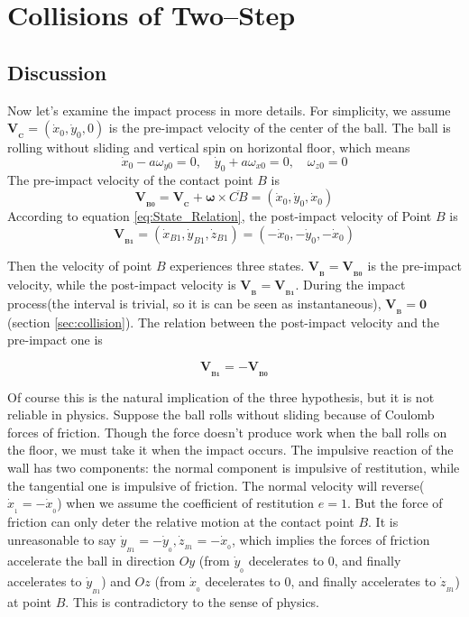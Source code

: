 \documentclass[preprint,12pt]{elsarticle}
\renewcommand{\vec}[1]{\boldsymbol{#1}}
\begin{document}
\section{Collisions of Two--Step}\label{sec:collision_two_step}
\subsection{Discussion}
Now let's examine the impact process in more details.
For simplicity, we assume $\vec{V_{_C}}=(\dot{x}_0,\dot{y}_0,0)$ is the pre-impact velocity of the center of the ball. The ball is rolling without sliding and vertical spin on horizontal floor, which means
\begin{equation}
  \dot{x}_0-a\omega_{y0}=0,\quad \dot{y}_0+a \omega_{x0}=0,\quad\omega_{z0}=0
\end{equation}
The pre-impact velocity of the contact point $B$ is
\begin{equation}
  \vec{V_{_{B0}}}=\vec{V_{_C}}+\vec{\omega} \times \overline{CB}=(\dot{x}_0,\dot{y}_0,\dot{x}_0)
\end{equation}
According to equation \eqref{eq:State_Relation}, the post-impact velocity of Point $B$ is
\begin{equation}
  \vec{V_{_{B1}}}=(\dot{x}_{B1},\dot{y}_{B1},\dot{z}_{B1})=(-\dot{x}_0,-\dot{y}_0,-\dot{x}_0)
\end{equation}

Then the velocity of point $B$ experiences three states. $\vec{V_{_{B}}}=\vec{V_{_{B0}}}$ is the pre-impact velocity, while the post-impact velocity is $\vec{V_{_{B}}}=\vec{V_{_{B1}}}$. During the impact process(the interval is trivial, so it is can be seen as instantaneous), $\vec{V_{_{B}}}=\vec{0}$(section \ref{sec:collision}). The relation between the post-impact velocity and the pre-impact one is

\begin{equation}
  \vec{V_{_{B1}}}=-\vec{V_{_{B0}}}
\end{equation}

Of course this is the natural implication of the three hypothesis, but it is not reliable in physics.
Suppose the ball rolls without sliding because of Coulomb forces of friction.
Though the force doesn't produce work when the ball rolls on the floor, we must take it when the impact occurs.
The impulsive reaction of the wall has two components: the normal component is impulsive of restitution, while the tangential one is impulsive of friction.
The normal velocity will reverse($\dot{x}_{_1}=-\dot{x}_{_0}$) when we assume the coefficient of restitution $e=1$.
But the force of friction can only deter the relative motion at the contact point $B$. It is unreasonable to say $\dot{y}_{_{B1}}=-\dot{y}_{_0},\dot{z}_{_{B1}}=-\dot{x}_{_0}$, which implies the forces of friction accelerate the ball in direction $Oy$ (from $\dot{y}_{_0}$ decelerates to $0$, and finally accelerates to $\dot{y}_{_{B1}}$) and $Oz$ (from $\dot{x}_{_0}$ decelerates to $0$, and finally accelerates to $\dot{z}_{_{B1}}$) at point $B$. This is contradictory to the sense of physics.
\end{document}
